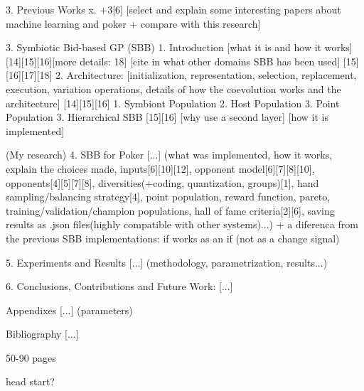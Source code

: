     3. Previous Works
        x. +3[6] [select and explain some interesting papers about machine learning and poker + compare with this research]

3. Symbiotic Bid-based GP (SBB)
    1. Introduction
        [what it is and how it works] [14][15][16][more details: 18]
        [cite in what other domains SBB has been used] [15][16][17][18]
    2. Architecture: [initialization, representation, selection, replacement, execution, variation operations, details of how the coevolution works and the architecture] [14][15][16]
        1. Symbiont Population
        2. Host Population
        3. Point Population        
    3. Hierarchical SBB [15][16]
        [why use a second layer]
        [how it is implemented]

(My research)
4. SBB for Poker
[...] (what was implemented, how it works, explain the choices made, inputs[6][10][12], opponent model[6][7][8][10], opponents[4][5][7][8], diversities(+coding, quantization, groups)[1], hand sampling/balancing strategy[4], point population, reward function, pareto, training/validation/champion populations, hall of fame criteria[2][6], saving results as .json files(highly compatible with other systems)...)
+ a diferenca from the previous SBB implementations: if works as an if (not as a change signal)

5. Experiments and Results
[...] (methodology, parametrization, results...)

6. Conclusions, Contributions and Future Work:
[...]

Appendixes
[...] (parameters)

Bibliography
[...]


50-90 pages

head start?

